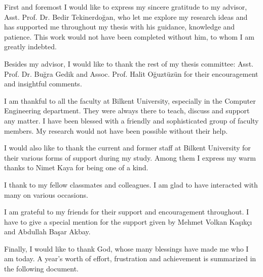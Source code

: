 \begin{ack}
First and foremost I would like to express my sincere gratitude to my advisor, 
Asst. Prof. Dr. Bedir Tekinerdo\u{g}an, 
who let me explore my research ideas and has supported me throughout my 
thesis with his guidance, knowledge and patience. This work would not have 
been completed without him, to whom I am greatly indebted.

Besides my advisor, I would like to thank the rest of my thesis committee: 
Asst. Prof. Dr. Bu\u{g}ra Gedik and Assoc. Prof. Halit O\u{g}uzt\"{u}z\"{u}n 
for their encouragement and insightful comments.

I am thankful to all the faculty at Bilkent University, especially in the Computer 
Engineering department. They were always there to teach, discuss and 
support any matter. I have been blessed with a friendly and sophisticated 
group of faculty members. My research would not have been possible 
without their help.

I would also like to thank the current and former staff at Bilkent University 
for their various forms of support during my study. Among them I express 
my warm thanks to Nimet Kaya for being one of a kind.

I thank to my fellow classmates and colleagues. I am glad to have 
interacted with many on various occasions.

I am grateful to my friends for their support and encouragement throughout. 
I have to give a special mention for the support given by Mehmet Volkan 
Ka\c{s}{\i}k\c{c}{\i} and Abdullah Ba\c{s}ar Akbay.

Finally, I would like to thank God, whose many blessings have made me 
who I am today. A year's worth of effort, frustration and achievement is 
summarized in the following document.
\end{ack}